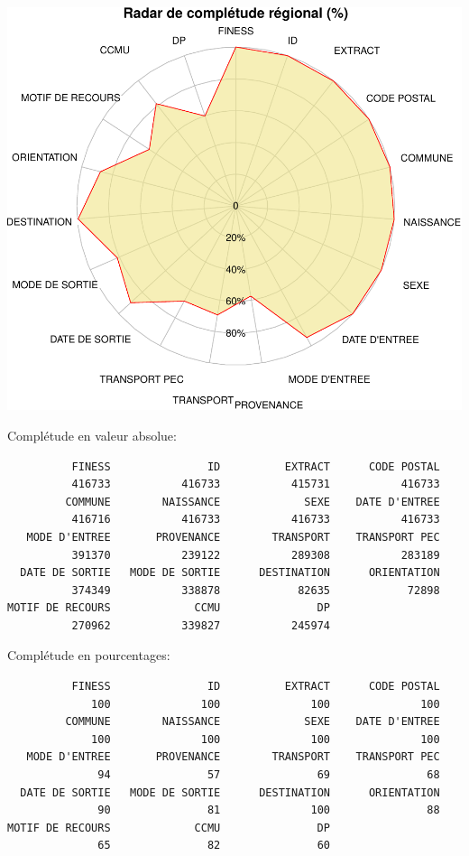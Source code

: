 \documentclass[]{article}
\begin{document}
\includegraphics{rapport2014_V4_files/figure-latex/radar-1.pdf}

Complétude en valeur absolue:

\begin{verbatim}
          FINESS               ID          EXTRACT      CODE POSTAL 
          416733           416733           415731           416733 
         COMMUNE        NAISSANCE             SEXE    DATE D'ENTREE 
          416716           416733           416733           416733 
   MODE D'ENTREE       PROVENANCE        TRANSPORT    TRANSPORT PEC 
          391370           239122           289308           283189 
  DATE DE SORTIE   MODE DE SORTIE      DESTINATION      ORIENTATION 
          374349           338878            82635            72898 
MOTIF DE RECOURS             CCMU               DP 
          270962           339827           245974 
\end{verbatim}

Complétude en pourcentages:

\begin{verbatim}
          FINESS               ID          EXTRACT      CODE POSTAL 
             100              100              100              100 
         COMMUNE        NAISSANCE             SEXE    DATE D'ENTREE 
             100              100              100              100 
   MODE D'ENTREE       PROVENANCE        TRANSPORT    TRANSPORT PEC 
              94               57               69               68 
  DATE DE SORTIE   MODE DE SORTIE      DESTINATION      ORIENTATION 
              90               81              100               88 
MOTIF DE RECOURS             CCMU               DP 
              65               82               60 
\end{verbatim}
\end{document}
